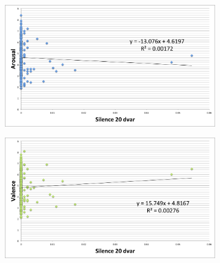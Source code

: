 \begin{figure}
             \begin{subfigure}[b]{0.48\textwidth}
                \includegraphics[width=\textwidth]{Figures/silence20dvar-arousal}
			   \vspace{20pt}
        \end{subfigure}
        \begin{subfigure}[b]{0.48\textwidth}
                \includegraphics[width=\textwidth]{Figures/silence20dvar-valence}
                  \vspace{20pt}
        \end{subfigure}
        
\end{figure}


